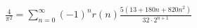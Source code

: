 \documentclass[preview]{standalone}
\begin{document}
\begin{align*}
\frac{4}{\pi^2} = \sum_{n=0}^{\infty} (-1)^n r(n) \frac{5(13 + 180n + 820n^2)}{32 \cdot 2^{n+1}}
\end{align*}
\end{document}
